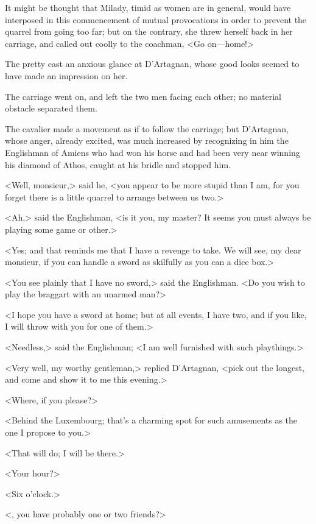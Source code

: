 It might be thought that Milady, timid as women are in general, would have interposed in this commencement of mutual provocations in order to prevent the quarrel from going too far; but on the contrary, she threw herself back in her carriage, and called out coolly to the coachman, <Go on—home!> 

The pretty  cast an anxious glance at D'Artagnan, whose good looks seemed to have made an impression on her. 

The carriage went on, and left the two men facing each other; no material obstacle separated them. 

The cavalier made a movement as if to follow the carriage; but D'Artagnan, whose anger, already excited, was much increased by recognizing in him the Englishman of Amiens who had won his horse and had been very near winning his diamond of Athos, caught at his bridle and stopped him. 

<Well, monsieur,> said he, <you appear to be more stupid than I am, for you forget there is a little quarrel to arrange between us two.> 

<Ah,> said the Englishman, <is it you, my master? It seems you must always be playing some game or other.> 

<Yes; and that reminds me that I have a revenge to take. We will see, my dear monsieur, if you can handle a sword as skilfully as you can a dice box.> 

<You see plainly that I have no sword,> said the Englishman. <Do you wish to play the braggart with an unarmed man?> 

<I hope you have a sword at home; but at all events, I have two, and if you like, I will throw with you for one of them.> 

<Needless,> said the Englishman; <I am well furnished with such playthings.> 

<Very well, my worthy gentleman,> replied D'Artagnan, <pick out the longest, and come and show it to me this evening.> 

<Where, if you please?> 

<Behind the Luxembourg; that's a charming spot for such amusements as the one I propose to you.> 

<That will do; I will be there.> 

<Your hour?> 

<Six o'clock.> 

<, you have probably one or two friends?> 

